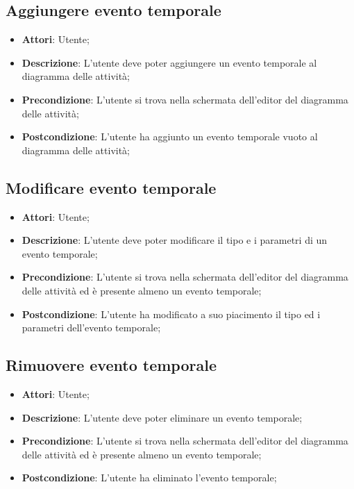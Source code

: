 \documentclass[../AnalisiDeiRequisiti.tex]{subfiles}
\begin{document}
	\subsection{Aggiungere evento temporale}
	\begin{itemize}
		\item \textbf{Attori}: Utente;
		\item \textbf{Descrizione}: L'utente deve poter aggiungere un evento temporale al diagramma delle attività;
		\item \textbf{Precondizione}: L'utente si trova nella schermata dell'editor del diagramma delle attività;
		\item \textbf{Postcondizione}: L'utente ha aggiunto un evento temporale vuoto al diagramma delle attività;
	\end{itemize}
	
	\subsection{Modificare evento temporale}
	\begin{itemize}
		\item \textbf{Attori}: Utente;
		\item \textbf{Descrizione}: L'utente deve poter modificare il tipo e i parametri di un evento temporale;
		\item \textbf{Precondizione}: L'utente si trova nella schermata dell'editor del diagramma delle attività ed è presente almeno un evento temporale;
		\item \textbf{Postcondizione}: L'utente ha modificato a suo piacimento il tipo ed i parametri dell'evento temporale;
	\end{itemize}
	
	\subsection{Rimuovere evento temporale}
	\begin{itemize}
		\item \textbf{Attori}: Utente;
		\item \textbf{Descrizione}: L'utente deve poter eliminare un evento temporale;
		\item \textbf{Precondizione}: L'utente si trova nella schermata dell'editor del diagramma delle attività ed è presente almeno un evento temporale;
		\item \textbf{Postcondizione}: L'utente ha eliminato l'evento temporale;
	\end{itemize}
	
\end{document}
